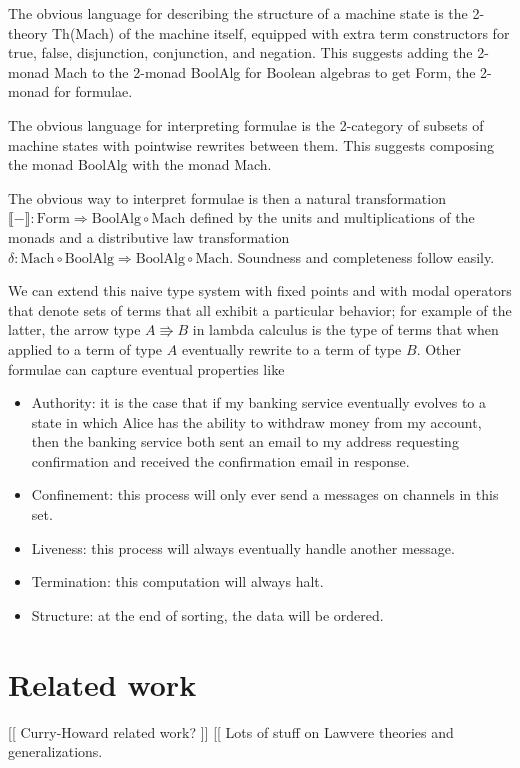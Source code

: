 \documentclass{article}
\newcommand{\interp}[1]{\llbracket #1 \rrbracket}
\newcommand{\maps}{\colon}
\newcommand{\Mach}{\mathrm{Mach}}
\newcommand{\BoolAlg}{\mathrm{BoolAlg}}
\newcommand{\Form}{\mathrm{Form}}
\begin{document}
  The obvious language for describing the structure of a machine state is the 2-theory Th(Mach) of the machine itself, equipped with extra term constructors for true, false, disjunction, conjunction, and negation.  This suggests adding the 2-monad Mach to the 2-monad BoolAlg for Boolean algebras to get Form, the 2-monad for formulae.

  The obvious language for interpreting formulae is the 2-category of subsets of machine states with pointwise rewrites between them.  This suggests composing the monad BoolAlg with the monad Mach.

  The obvious way to interpret formulae is then a natural transformation $\interp{-} \maps \Form \Rightarrow \BoolAlg \circ \Mach$ defined by the units and multiplications of the monads and a distributive law transformation $\delta\maps \Mach \circ \BoolAlg \Rightarrow \BoolAlg \circ \Mach.$  Soundness and completeness follow easily.

  We can extend this naive type system with fixed points and with modal operators that denote sets of terms that all exhibit a particular behavior; for example of the latter, the arrow type $A \Rrightarrow B$ in lambda calculus is the type of terms that when applied to a term of type $A$ eventually rewrite to a term of type $B$.  Other formulae can capture eventual properties like
\begin{itemize}
  \item Authority: it is the case that if my banking service eventually evolves to a state in which Alice has the ability to withdraw money from my account, then the banking service both sent an email to my address requesting confirmation and received the confirmation email in response.
  \item Confinement: this process will only ever send a messages on channels in this set.
  \item Liveness: this process will always eventually handle another message.
  \item Termination: this computation will always halt.
  \item Structure: at the end of sorting, the data will be ordered.
\end{itemize}

\section{Related work}
[[ Curry-Howard related work? ]]
[[ Lots of stuff on Lawvere theories and generalizations.  
\end{document}
